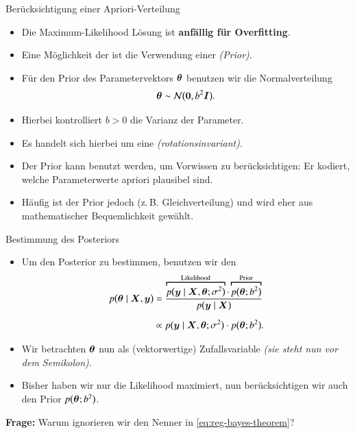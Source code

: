 \begin{frame}{Berücksichtigung einer Apriori-Verteilung}{}
	\begin{itemize}
		\item Die Maximum-Likelihood Lösung ist \textbf{anfällig für Overfitting}.
		\item Eine Möglichkeit der  ist die Verwendung einer  \textit{(Prior)}.
		\item Für den Prior des Parametervektors $\bm{\theta}$ benutzen wir die Normalverteilung
		\begin{equation}
			\bm{\theta} \sim \mathcal{N}\bigl( \bm{0}, b^2 \bm{I} \bigr).
		\end{equation}
		\item Hierbei kontrolliert $b > 0$ die Varianz der Parameter.
		\item Es handelt sich hierbei um eine  \textit{(rotationsinvariant)}.
		\item Der Prior kann benutzt werden, um Vorwissen zu berücksichtigen: Er kodiert, welche Parameterwerte apriori plausibel sind.
		\item Häufig ist der Prior jedoch  (z.\,B. Gleichverteilung) und wird eher aus mathematischer Bequemlichkeit gewählt.
	\end{itemize}
\end{frame}


\begin{frame}{Bestimmung des Posteriors}{}
	\begin{itemize}
		\item Um den Posterior zu bestimmen, benutzen wir den 
		\begin{equation} \label{eq:reg-bayes-theorem}
			\begin{aligned}
				p\bigl( \btheta \mid \bX, \by \bigr)
					&= \frac{\overbracket{
						p\bigl( \by \mid \bX, \btheta; \sigma^2 \bigr)
					}^{\text{Likelihood}} \cdot \overbracket{p\bigl( \btheta; b^2 \bigr)}^{\text{Prior}}}{p\bigl( \by \mid \bX \bigr)}
			\\[2mm]
					&\propto p\bigl( \by \mid \bX, \btheta; \sigma^2 \bigr) \cdot p\bigl( \btheta; b^2 \bigr).
			\end{aligned}
		\end{equation}
		\item Wir betrachten $\bm{\theta}$ nun als (vektorwertige) Zufallsvariable \textit{(sie steht nun vor dem Semikolon)}.
		\item Bisher haben wir nur die Likelihood maximiert, nun berücksichtigen wir auch den Prior $p\bigl( \bm{\theta}; b^2 \bigr)$.
	\end{itemize}
	
	\begin{boxGray}
		\textbf{Frage:} Warum ignorieren wir den Nenner in \eqref{eq:reg-bayes-theorem}?
	\end{boxGray}
\end{frame}


